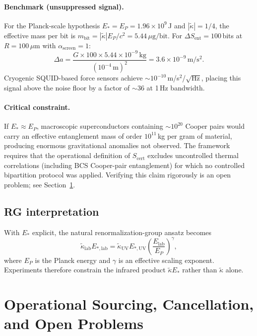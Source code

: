\documentclass[11pt]{article}
\theoremstyle{plain}
\theoremstyle{definition}
\theoremstyle{remark}
\begin{document}
\paragraph{Benchmark (unsuppressed signal).}
For the Planck-scale hypothesis $E_* = E_P = 1.96\times10^9$\,J and $|\tilde{\kappa}| = 1/4$, the
effective mass per bit is $m_{\mathrm{bit}} = |\tilde{\kappa}|E_P/c^2 = 5.44\,\mu\mathrm{g/bit}$.
For $\Delta S_{\mathrm{ent}} = 100$\,bits at $R = 100\,\mu\mathrm{m}$ with $\alpha_{\mathrm{screen}} = 1$:
\begin{equation}
\Delta a
= \frac{G \times 100 \times 5.44\times10^{-9}\,\mathrm{kg}}{(10^{-4}\,\mathrm{m})^2}
= 3.6\times10^{-9}\,\mathrm{m/s^2}.
\end{equation}
Cryogenic SQUID-based force sensors achieve $\sim 10^{-10}$\,m/s$^2$/\hspace{0.5pt}$\sqrt{\mathrm{Hz}}$,
placing this signal above the noise floor by a factor of $\sim\!36$ at 1\,Hz bandwidth.

\paragraph{Critical constraint.}
If $E_* \approx E_P$, macroscopic superconductors containing $\sim\!10^{20}$ Cooper pairs would
carry an effective entanglement mass of order $10^{11}$\,kg per gram of material, producing
enormous gravitational anomalies not observed. The framework requires that the operational
definition of $S_{\mathrm{cert}}$ excludes uncontrolled thermal correlations (including BCS
Cooper-pair entanglement) for which no controlled bipartition protocol was applied. Verifying
this claim rigorously is an open problem; see Section~\ref{sec:open-problems}.

\subsection{RG interpretation}

With $E_*$ explicit, the natural renormalization-group ansatz becomes
\begin{equation}
\tilde{\kappa}_{\mathrm{lab}}E_{*,\mathrm{lab}} = \tilde{\kappa}_{\mathrm{UV}}E_{*,\mathrm{UV}}\left(\frac{E_{\mathrm{lab}}}{E_P}\right)^\gamma,
\end{equation}
where $E_P$ is the Planck energy and $\gamma$ is an effective scaling exponent. Experiments therefore constrain the infrared product $\tilde{\kappa}E_*$ rather than $\tilde{\kappa}$ alone.


\section{Operational Sourcing, Cancellation, and Open Problems}
\label{sec:open-problems}
\end{document}

